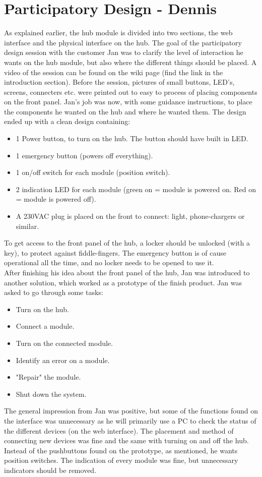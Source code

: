 \section{Participatory Design - Dennis}
As explained earlier, the hub module is divided into two sections, the web interface and the physical interface on the hub. 
The goal of the participatory design session with the customer Jan was to clarify the level of interaction he wants on the hub module, but also where the different things should be placed. A video of the session can be found on the wiki page (find the link in the introduction section). Before the session, pictures of small buttons, LED's, screens, connecters etc. were printed out to easy to process of placing components on the front panel. Jan's job was now, with some guidance instructions, to place the components he wanted on the hub and where he wanted them. The design ended up with a clean design containing: 
\begin{itemize}
	\item 1 Power button, to turn on the hub. The button should have built in LED.
	\item 1 emergency button (powers off everything).
	\item 1 on/off switch for each module (position switch).
	\item 2 indication LED for each module (green on = module is powered on. Red on = module is powered off).
	\item A 230VAC plug is placed on the front to connect: light, phone-chargers or similar. 
\end{itemize}
To get access to the front panel of the hub, a locker should be unlocked (with a key), to protect against fiddle-fingers. The emergency button is of cause operational all the time, and no locker needs to be opened to use it.
\\[0.2cm]After finishing his idea about the front panel of the hub, Jan was introduced to another solution, which worked as a prototype of the finish product. Jan was asked to go through some tasks:
\begin{itemize}
	\item Turn on the hub.
	\item Connect a module.
	\item Turn on the connected module.
	\item Identify an error on a module.
	\item "Repair" the module.
	\item Shut down the system.
\end{itemize}
The general impression from Jan was positive, but some of the functions found on the interface was unnecessary as he will primarily use a PC to check the status of the different devices (on the web interface). The placement and method of connecting new devices was fine and the same with turning on and off the hub. Instead of the pushbuttons found on the prototype, as mentioned, he wants position switches. The indication of every module was fine, but unnecessary indicators should be removed. 
